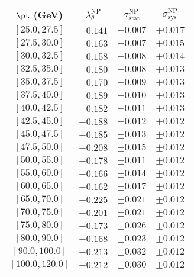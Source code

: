 \begin{tabular}{c||c||c|c}
$\pt$ (GeV) & $\lambda_\theta^{\text{NP}}$ & $\sigma_{\text{stat}}^{\text{NP}}$ & $\sigma_{\text{sys}}^{\text{NP}}$  \\
\hline
$[25.0, 27.5]$& $-0.141$ & $\pm0.007$ & $\pm0.017$\\
$[27.5, 30.0]$& $-0.163$ & $\pm0.007$ & $\pm0.015$\\
$[30.0, 32.5]$& $-0.158$ & $\pm0.008$ & $\pm0.014$\\
$[32.5, 35.0]$& $-0.180$ & $\pm0.008$ & $\pm0.013$\\
$[35.0, 37.5]$& $-0.170$ & $\pm0.009$ & $\pm0.013$\\
$[37.5, 40.0]$& $-0.189$ & $\pm0.010$ & $\pm0.013$\\
$[40.0, 42.5]$& $-0.182$ & $\pm0.011$ & $\pm0.013$\\
$[42.5, 45.0]$& $-0.188$ & $\pm0.012$ & $\pm0.012$\\
$[45.0, 47.5]$& $-0.185$ & $\pm0.013$ & $\pm0.012$\\
$[47.5, 50.0]$& $-0.208$ & $\pm0.015$ & $\pm0.012$\\
$[50.0, 55.0]$& $-0.178$ & $\pm0.011$ & $\pm0.012$\\
$[55.0, 60.0]$& $-0.166$ & $\pm0.014$ & $\pm0.012$\\
$[60.0, 65.0]$& $-0.162$ & $\pm0.017$ & $\pm0.012$\\
$[65.0, 70.0]$& $-0.225$ & $\pm0.021$ & $\pm0.012$\\
$[70.0, 75.0]$& $-0.201$ & $\pm0.021$ & $\pm0.012$\\
$[75.0, 80.0]$& $-0.173$ & $\pm0.026$ & $\pm0.012$\\
$[80.0, 90.0]$& $-0.168$ & $\pm0.023$ & $\pm0.012$\\
$[90.0, 100.0]$& $-0.213$ & $\pm0.032$ & $\pm0.012$\\
$[100.0, 120.0]$& $-0.212$ & $\pm0.030$ & $\pm0.012$\\
\end{tabular}
